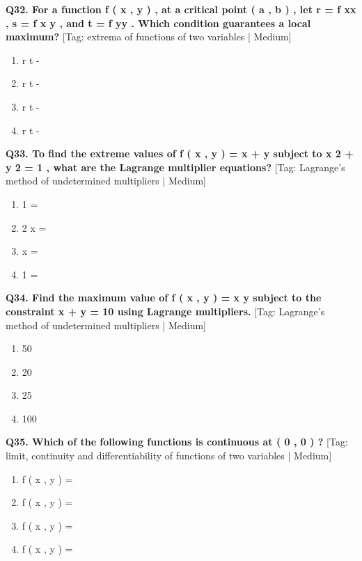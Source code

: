 \noindent\textbf{Q32. For a function f ( x , y ) , at a critical point ( a , b ) , let r = f xx , s = f x y , and t = f yy . Which condition guarantees a local maximum?} \hfill [Tag: extrema of functions of two variables | Medium]
\begin{enumerate}[label=(\alph*),topsep=2pt,itemsep=1pt,partopsep=0pt,parsep=0pt]
    \item {{r t -}}
    \item {{r t -}}
    \item {{r t -}}
    \item {{r t -}}
\end{enumerate}
\vspace{2mm}

\noindent\textbf{Q33. To find the extreme values of f ( x , y ) = x + y subject to x 2 + y 2 = 1 , what are the Lagrange multiplier equations?} \hfill [Tag: Lagrange's method of undetermined multipliers | Medium]
\begin{enumerate}[label=(\alph*),topsep=2pt,itemsep=1pt,partopsep=0pt,parsep=0pt]
    \item {{1 =}}
    \item {{2 x =}}
    \item {{x =}}
    \item {{1 =}}
\end{enumerate}
\vspace{2mm}

\noindent\textbf{Q34. Find the maximum value of f ( x , y ) = x y subject to the constraint x + y = 10 using Lagrange multipliers.} \hfill [Tag: Lagrange's method of undetermined multipliers | Medium]
\begin{enumerate}[label=(\alph*),topsep=2pt,itemsep=1pt,partopsep=0pt,parsep=0pt]
    \item {{50}}
    \item {{20}}
    \item {{25}}
    \item {{100}}
\end{enumerate}
\vspace{2mm}

\noindent\textbf{Q35. Which of the following functions is continuous at ( 0 , 0 ) ?} \hfill [Tag: limit, continuity and differentiability of functions of two variables | Medium]
\begin{enumerate}[label=(\alph*),topsep=2pt,itemsep=1pt,partopsep=0pt,parsep=0pt]
    \item {{f ( x , y ) =}}
    \item {{f ( x , y ) =}}
    \item {{f ( x , y ) =}}
    \item {{f ( x , y ) =}}
\end{enumerate}
\vspace{2mm}

